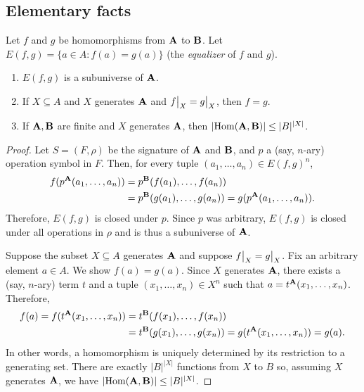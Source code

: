 \documentclass[11pt]{amsart}  %
\begin{document}
\subsection{Elementary facts}
\begin{lemma}
  \label{ex:1.16.6} 
  Let $f$ and $g$ be homomorphisms from $\mathbf{A}$ to $\mathbf{B}$.
  Let $E(f,g) = \{ a \in A : f(a) = g(a) \}$ (the \emph{equalizer} of $f$ and $g$). 
  \begin{enumerate}
    \item	$E(f,g)$ is a subuniverse of $\mathbf{A}$.
    \item If $X \subseteq A$ and $X$ generates $\mathbf{A}$ and
    $\restr{f}{X} = \restr{g}{X}$, then $f = g$. 
    \item If $\mathbf{A}, \mathbf{B}$ are finite and $X$ generates $\mathbf{A}$, 
    then $|\!\operatorname{Hom}(\mathbf{A},\mathbf{B})| \leq |B|^{|X|}$.
  \end{enumerate}
\end{lemma}
\begin{proof}
  Let $S = (F, \rho)$ be the signature of $\mathbf{A}$ and $\mathbf{B}$, and 
  $p$ a (say, $n$-ary) operation symbol in $F$. Then, 
  for every tuple $(a_1, \dots, a_n) \in E(f,g)^n$,
  \begin{align*}
    f(p^{\mathbf{A}}(a_1, \dots, a_n)) &= p^{\mathbf{B}}(f(a_1), \dots, f(a_n))\\
                                    &= p^{\mathbf{B}}(g(a_1), \dots, g(a_n))
                                     = g(p^{\mathbf{A}}(a_1, \dots, a_n)).
  \end{align*}
  Therefore, $E(f,g)$ is closed under $p$.  Since $p$ was arbitrary, 
  $E(f,g)$ is closed under all operations in $\rho$ and is thus a 
  subuniverse of $\mathbf{A}$.

  Suppose the subset $X \subseteq A$ generates $\mathbf{A}$ and suppose
  $\restr{f}{X} = \restr{g}{X}$.
  Fix an arbitrary element $a\in A$.  We show $f(a) = g(a)$.
  Since $X$ generates $\mathbf{A}$, there exists a (say, $n$-ary) term $t$ and 
  a tuple $(x_1, \dots, x_n) \in X^n$ such that 
  $a = t^{\mathbf{A}}(x_1, \dots, x_n)$. Therefore, 
  \begin{align*}
    f(a) = f(t^{\mathbf{A}}(x_1, \dots, x_n)) &= t^{\mathbf{B}}(f(x_1), \dots, f(x_n))\\
                                    &= t^{\mathbf{B}}(g(x_1), \dots, g(x_n))
                                     = g(t^{\mathbf{A}}(x_1, \dots, x_n)) = g(a).
  \end{align*}
  In other words, a homomorphism is uniquely determined by its restriction to 
  a generating set. There are exactly $|B|^{|X|}$ functions from $X$ to $B$ so, 
  assuming $X$ generates $\mathbf{A}$, we have
  $|\!\operatorname{Hom}(\mathbf{A},\mathbf{B})| \leq |B|^{|X|}$.
\end{proof}
\end{document}
